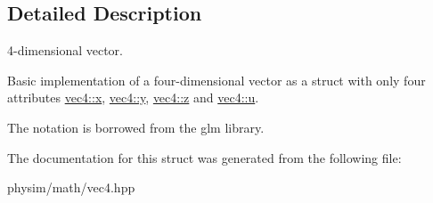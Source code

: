 \subsection{Detailed Description}
4-\/dimensional vector. 

Basic implementation of a four-\/dimensional vector as a struct with only four attributes \hyperlink{structphysim_1_1math_1_1vec4_a21bfa48cfaaf92c12e6af075ee661a3b}{vec4\+::x}, \hyperlink{structphysim_1_1math_1_1vec4_a718bf02c9b812d991467e1299de4b3d8}{vec4\+::y}, \hyperlink{structphysim_1_1math_1_1vec4_a46412c320c10c30f63dc4e54652f93f7}{vec4\+::z} and \hyperlink{structphysim_1_1math_1_1vec4_a04d868010d1b53431dbc96442d204685}{vec4\+::u}.

The notation is borrowed from the \textquotesingle{}glm\textquotesingle{} library. 

The documentation for this struct was generated from the following file\+:\begin{DoxyCompactItemize}
\item 
physim/math/vec4.\+hpp\end{DoxyCompactItemize}
